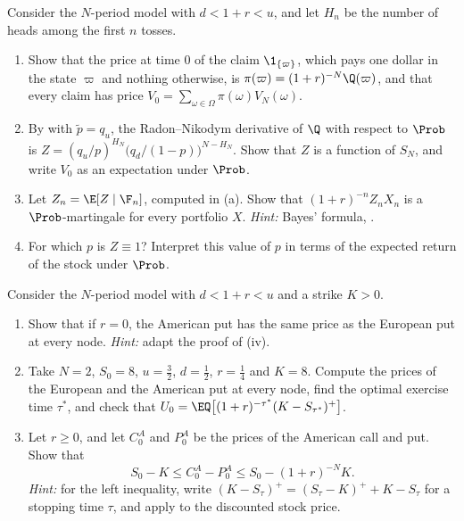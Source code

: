 \begin{exercise}\label{ex:bin-state-prices}
\easy Consider the $N$-period model with $d<1+r<u$, and let $H_n$ be the number of heads
among the first $n$ tosses.
\begin{enumerate}[label=(\alph*)]
  \item Show that the price at time $0$ of the claim $\1_{\{\varpi\}}$, which pays one
    dollar in the state $\varpi$ and nothing otherwise, is
    $\pi(\varpi)=(1+r)^{-N}\Q(\varpi)$, and that every claim has price
    $V_0=\sum_{\omega\in\Omega}\pi(\omega)V_N(\omega)$.
  \item By  with $\tilde p=q_u$, the Radon--Nikodym derivative
    of $\Q$ with respect to $\Prob$ is $Z=(q_u/p)^{H_N}\big(q_d/(1-p)\big)^{N-H_N}$. Show
    that $Z$ is a function of $S_N$, and write $V_0$ as an expectation under $\Prob$.
  \item Let $Z_n=\E[Z\mid\F_n]$, computed in (a). Show that
    $(1+r)^{-n}Z_nX_n$ is a $\Prob$-martingale for every portfolio $X$. \emph{Hint:}
    Bayes' formula, .
  \item For which $p$ is $Z\equiv1$? Interpret this value of $p$ in terms of the expected
    return of the stock under $\Prob$.
\end{enumerate}
\end{exercise}

\begin{exercise}\label{ex:bin-put}
\medium Consider the $N$-period model with $d<1+r<u$ and a strike $K>0$.
\begin{enumerate}[label=(\alph*)]
  \item Show that if $r=0$, the American put has the same price as the European put at
    every node. \emph{Hint:} adapt the proof of (iv).
  \item Take $N=2$, $S_0=8$, $u=\frac32$, $d=\frac12$, $r=\frac14$ and $K=8$. Compute the
    prices of the European and the American put at every node, find the optimal exercise
    time $\tau^*$, and check that
    $U_0=\EQ\big[(1+r)^{-\tau^*}(K-S_{\tau^*})^+\big]$.
  \item Let $r\ge0$, and let $C^A_0$ and $P^A_0$ be the prices of the American call and
    put. Show that
    \[
      S_0-K\le C^A_0-P^A_0\le S_0-(1+r)^{-N}K .
    \]
    \emph{Hint:} for the left inequality, write $(K-S_\tau)^+=(S_\tau-K)^++K-S_\tau$ for a
    stopping time $\tau$, and apply  to the discounted
    stock price.
\end{enumerate}
\end{exercise}


